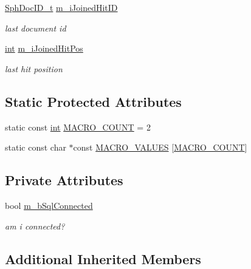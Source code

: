 \begin{DoxyCompactItemize}
\hyperlink{sphinx_8h_a3176771631c12a9e4897272003e6b447}{Sph\-Doc\-I\-D\-\_\-t} \hyperlink{structCSphSource__SQL_afb30bba746655166c6dc190a73224de0}{m\-\_\-i\-Joined\-Hit\-I\-D}
\begin{DoxyCompactList}\small\item\em last document id \end{DoxyCompactList}\item 
\hyperlink{sphinxexpr_8cpp_a4a26e8f9cb8b736e0c4cbf4d16de985e}{int} \hyperlink{structCSphSource__SQL_a5dc993ad2a0d01254d0da80600f7ef9a}{m\-\_\-i\-Joined\-Hit\-Pos}
\begin{DoxyCompactList}\small\item\em last hit position \end{DoxyCompactList}\end{DoxyCompactItemize}
\subsection*{Static Protected Attributes}
\begin{DoxyCompactItemize}
\item 
static const \hyperlink{sphinxexpr_8cpp_a4a26e8f9cb8b736e0c4cbf4d16de985e}{int} \hyperlink{structCSphSource__SQL_a6c0988492c5ee4c7eed91719640f9cbd}{M\-A\-C\-R\-O\-\_\-\-C\-O\-U\-N\-T} = 2
\item 
static const char $\ast$const \hyperlink{structCSphSource__SQL_a59789aa6096ddbf99c4b570123b470ac}{M\-A\-C\-R\-O\-\_\-\-V\-A\-L\-U\-E\-S} \mbox{[}\hyperlink{structCSphSource__SQL_a6c0988492c5ee4c7eed91719640f9cbd}{M\-A\-C\-R\-O\-\_\-\-C\-O\-U\-N\-T}\mbox{]}
\end{DoxyCompactItemize}
\subsection*{Private Attributes}
\begin{DoxyCompactItemize}
\item 
bool \hyperlink{structCSphSource__SQL_a1c63f7d16d59dee9fafd3b4203c1a61f}{m\-\_\-b\-Sql\-Connected}
\begin{DoxyCompactList}\small\item\em am i connected? \end{DoxyCompactList}\end{DoxyCompactItemize}
\subsection*{Additional Inherited Members}


